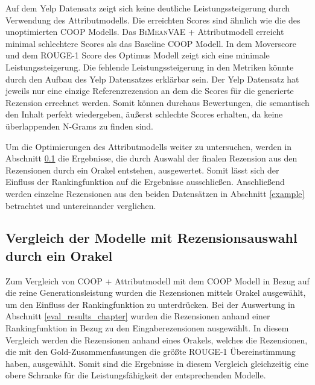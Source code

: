 Auf dem Yelp Datensatz zeigt sich keine deutliche Leistungssteigerung durch Verwendung des Attributmodells. 
Die erreichten Scores sind ähnlich wie die des unoptimierten COOP Modells. 
Das \textsc{BiMeanVAE} + Attributmodell erreicht minimal schlechtere Scores als das Baseline COOP Modell.
In dem Moverscore und dem ROUGE-1 Score des Optimus Modell zeigt sich eine minimale Leistungssteigerung.
Die fehlende Leistungssteigerung in den Metriken könnte durch den Aufbau des Yelp Datensatzes erklärbar sein. 
Der Yelp Datensatz hat jeweils nur eine einzige Referenzrezension an dem die Scores für die generierte Rezension errechnet werden.
Somit können durchaus Bewertungen, die semantisch den Inhalt perfekt wiedergeben, äußerst schlechte Scores erhalten, da keine überlappenden N-Grams zu finden sind.

Um die Optimierungen des Attributmodells weiter zu untersuchen, werden in Abschnitt \ref{oracle} die Ergebnisse, die durch Auswahl der finalen Rezension aus den Rezensionen durch ein Orakel entstehen, ausgewertet.
Somit lässt sich der Einfluss der Rankingfunktion auf die Ergebnisse ausschließen.
Anschließend werden einzelne Rezensionen aus den beiden Datensätzen in Abschnitt \ref{example} betrachtet und untereinander verglichen.



\subsection{Vergleich der Modelle mit Rezensionsauswahl durch ein Orakel}
\label{oracle}
Zum Vergleich von COOP + Attributmodell mit dem COOP Modell in Bezug auf die reine Generationsleistung wurden die Rezensionen mittels Orakel ausgewählt, um den Einfluss der Rankingfunktion zu unterdrücken.
Bei der Auswertung in Abschnitt \ref{eval_results_chapter} wurden die Rezensionen anhand einer Rankingfunktion in Bezug zu den Eingaberezensionen ausgewählt.
In diesem Vergleich werden die Rezensionen anhand eines Orakels, welches die Rezensionen, die mit den Gold-Zusammenfassungen die größte ROUGE-1 Übereinstimmung haben, ausgewählt.
Somit sind die Ergebnisse in diesem Vergleich gleichzeitig eine obere Schranke für die Leistungsfähigkeit der entsprechenden Modelle.


